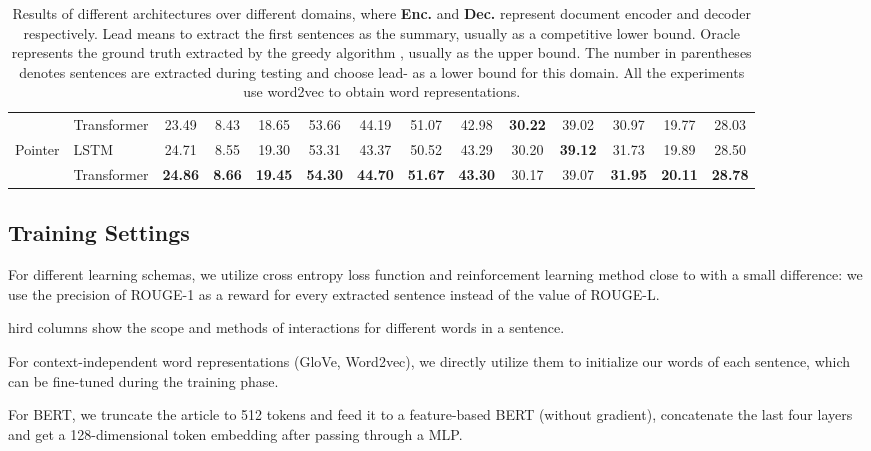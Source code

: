 \documentclass[11pt,a4paper]{article}
\begin{document}
\begin{table*}[t]
\begin{tabular}{llccc|ccc|ccc|ccc}
& Transformer &  23.49 & 8.43 & 18.65 & 53.66 & 44.19 & 51.07 & 42.98 & \textbf{30.22} & 39.02 & 30.97 & 19.77 & 28.03 \\
\multirow{2}{*}{Pointer} & LSTM  & 24.71 & 8.55 & 19.30 & 53.31 & 43.37 & 50.52 & 43.29 & 30.20 & \textbf{39.12} & 31.73 & 19.89 & 28.50 \\
& Transformer & \textbf{24.86} & \textbf{8.66} & \textbf{19.45} & \textbf{54.30} & \textbf{44.70} & \textbf{51.67} & \textbf{43.30} & 30.17 & 39.07 & \textbf{31.95} & \textbf{20.11} & \textbf{28.78} \\


\bottomrule
\end{tabular}
\caption{
Results of different architectures over different domains, where \textbf{Enc.} and \textbf{Dec.} represent document encoder and decoder respectively. Lead means to extract the first  sentences as the summary, usually as a competitive lower bound. Oracle represents the ground truth extracted by the greedy algorithm \cite{nallapati2017summarunner}, usually as the upper bound. The number  in parentheses denotes  sentences are extracted during testing and choose lead- as a lower bound for this domain. All the experiments use word2vec to obtain word representations.
} \label{tab:all-models}
\end{table*}




\subsection{Training Settings}
For different learning schemas, we utilize cross entropy loss function and reinforcement learning method close to \citet{chen2018fast} with a small difference: we use the precision of ROUGE-1 as a reward for every extracted sentence instead of the  value of ROUGE-L.

hird columns show the scope and methods of interactions for different words  in a sentence.





For context-independent word representations (GloVe, Word2vec), we directly utilize them to initialize our words of each sentence, which can be fine-tuned during the training phase.

For BERT, we truncate the article to 512 tokens and feed it to a feature-based BERT (without gradient), concatenate the last four layers and get a 128-dimensional token embedding after passing through a MLP.
\end{document}
